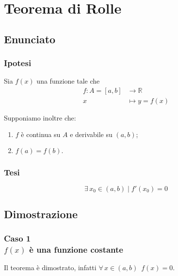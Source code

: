 \documentclass[../dimostrazioni]{subfiles}
\begin{document}
    \chapter{Teorema di Rolle}
    \label{teoRolle}

        \section*{Enunciato}

            \subsection*{Ipotesi}

                Sia \(f(x)\) una funzione tale che
                \begin{align*}
                    f : A = [a, b] &\longrightarrow \mathbb{R}\\
                    x &\longmapsto y = f(x) 
                \end{align*}

                Supponiamo inoltre che:

                \begin{enumerate}
                    \indentitem \item \(f\) è continua su \(A\) e derivabile su \((a, b)\);
                    \indentitem \item \(f(a) = f(b)\).
                \end{enumerate}

            \subsection*{Tesi}

                \[\exists \, x_0 \in (a,b) \; | \; f'(x_0) = 0 \]

        \section*{Dimostrazione}

            \subsection*{Caso 1\\\(f(x)\) è una funzione costante}

            Il teorema è dimostrato, infatti \(\forall \, x \in (a,b) \, \, \, f(x) = 0\).
\end{document}
